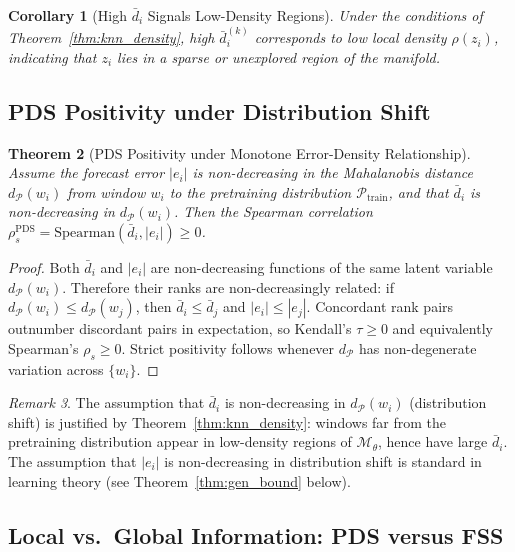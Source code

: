 \documentclass[12pt]{article}
\newtheorem{theorem}{Theorem}[section]
\newtheorem{corollary}[theorem]{Corollary}
\theoremstyle{definition}
\theoremstyle{remark}
\newtheorem{remark}[theorem]{Remark}
\newcommand{\Pset}{\mathcal{P}}
\newcommand{\trm}{\mathcal{M}_\theta}
\newcommand{\rspear}{\rho_s}
\begin{document}
\begin{corollary}[High $\bar{d}_i$ Signals Low-Density Regions]
\label{cor:knn_ood}
Under the conditions of Theorem~\ref{thm:knn_density}, high $\bar{d}_i^{(k)}$
corresponds to low local density $\rho(z_i)$, indicating that $z_i$ lies in
a sparse or unexplored region of the manifold.
\end{corollary}

\subsection{PDS Positivity under Distribution Shift}

\begin{theorem}[PDS Positivity under Monotone Error-Density Relationship]
\label{thm:pds_positive}
Assume the forecast error $|e_i|$ is non-decreasing in the Mahalanobis
distance $d_{\Pset}(w_i)$ from window $w_i$ to the pretraining distribution
$\Pset_{\mathrm{train}}$, and that $\bar{d}_i$ is non-decreasing in
$d_{\Pset}(w_i)$. Then the Spearman correlation
$\rspear^{\mathrm{PDS}} = \mathrm{Spearman}(\bar{d}_i, |e_i|) \geq 0$.
\end{theorem}

\begin{proof}
Both $\bar{d}_i$ and $|e_i|$ are non-decreasing functions of the same
latent variable $d_{\Pset}(w_i)$. Therefore their ranks are non-decreasingly
related: if $d_{\Pset}(w_i) \leq d_{\Pset}(w_j)$, then
$\bar{d}_i \leq \bar{d}_j$ and $|e_i| \leq |e_j|$. Concordant rank pairs
outnumber discordant pairs in expectation, so Kendall's $\tau \geq 0$ and
equivalently Spearman's $\rspear \geq 0$.
Strict positivity follows whenever $d_{\Pset}$ has non-degenerate variation
across $\{w_i\}$.
\end{proof}

\begin{remark}
The assumption that $\bar{d}_i$ is non-decreasing in $d_{\Pset}(w_i)$
(distribution shift) is justified by
Theorem~\ref{thm:knn_density}: windows far from the pretraining distribution
appear in low-density regions of $\trm$, hence have large $\bar{d}_i$.
The assumption that $|e_i|$ is non-decreasing in distribution shift is
standard in learning theory (see Theorem~\ref{thm:gen_bound} below).
\end{remark}

\subsection{Local vs.\ Global Information: PDS versus FSS}
\end{document}
